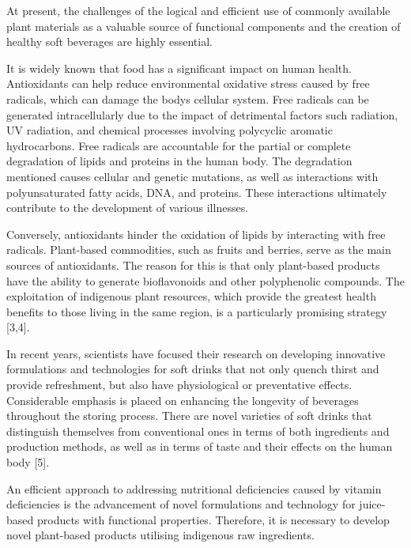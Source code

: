 At present, the challenges of the logical and efficient use of commonly
available plant materials as a valuable source of functional components
and the creation of healthy soft beverages are highly essential.

It is widely known that food has a significant impact on human health.
Antioxidants can help reduce environmental oxidative stress caused by
free radicals, which can damage the body\textquotesingle s cellular
system. Free radicals can be generated intracellularly due to the impact
of detrimental factors such radiation, UV radiation, and chemical
processes involving polycyclic aromatic hydrocarbons. Free radicals are
accountable for the partial or complete degradation of lipids and
proteins in the human body. The degradation mentioned causes cellular
and genetic mutations, as well as interactions with polyunsaturated
fatty acids, DNA, and proteins. These interactions ultimately contribute
to the development of various illnesses.

Conversely, antioxidants hinder the oxidation of lipids by interacting
with free radicals. Plant-based commodities, such as fruits and berries,
serve as the main sources of antioxidants. The reason for this is that
only plant-based products have the ability to generate bioflavonoids and
other polyphenolic compounds. The exploitation of indigenous plant
resources, which provide the greatest health benefits to those living in
the same region, is a particularly promising strategy {[}3,4{]}.

In recent years, scientists have focused their research on developing
innovative formulations and technologies for soft drinks that not only
quench thirst and provide refreshment, but also have physiological or
preventative effects. Considerable emphasis is placed on enhancing the
longevity of beverages throughout the storing process. There are novel
varieties of soft drinks that distinguish themselves from conventional
ones in terms of both ingredients and production methods, as well as in
terms of taste and their effects on the human body {[}5{]}.~

An efficient approach to addressing nutritional deficiencies caused by
vitamin deficiencies is the advancement of novel formulations and
technology for juice-based products with functional properties.
Therefore, it is necessary to develop novel plant-based products
utilising indigenous raw ingredients.~

